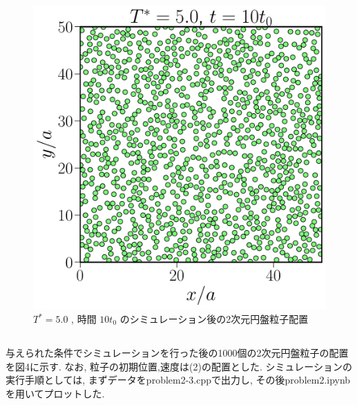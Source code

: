 \documentclass[a4paper,dvipdfmx]{jarticle}
\begin{document}
\begin{figure}[H]
    \centering
    \includegraphics[scale=0.6]{problem_2/2-2/problem2-2.pdf}
    \caption{$T^*=5.0$ , 時間 $10t_0$ のシミュレーション後の2次元円盤粒子配置}
\end{figure}

\subsection{}
\noindent
与えられた条件でシミュレーションを行った後の1000個の2次元円盤粒子の配置を図4に示す.
なお, 粒子の初期位置,速度は(2)の配置とした.
シミュレーションの実行手順としては, まずデータをproblem2-3.cppで出力し, 
その後problem2.ipynbを用いてプロットした.
\end{document}

